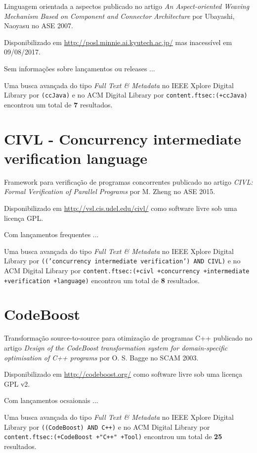 Linguagem orientada a aspectos
publicado no artigo {\it An Aspect-oriented Weaving Mechanism Based on Component and Connector Architecture}
por Ubayashi, Naoyasu
no ASE 2007.

Disponibilizado em \url{http://posl.minnie.ai.kyutech.ac.jp/}
mas inacessível em 09/08/2017.

Sem informações sobre lançamentos ou releases ...


Uma busca avançada do tipo {\it Full Text \& Metadata} no IEEE Xplore Digital Library por
\texttt{(ccJava)}
e no ACM Digital Library por
\texttt{content.ftsec:(+ccJava)}
encontrou um total de
{\bf 7}
resultados.

\section{CIVL - Concurrency intermediate verification language}

Framework para verificação de programas concorrentes
publicado no artigo {\it CIVL: Formal Verification of Parallel Programs}
por M. Zheng
no ASE 2015.

Disponibilizado em \url{http://vsl.cis.udel.edu/civl/}
como software livre
sob uma licença GPL.

Com lançamentos frequentes ...


Uma busca avançada do tipo {\it Full Text \& Metadata} no IEEE Xplore Digital Library por
\texttt{(('concurrency intermediate verification') AND CIVL)}
e no ACM Digital Library por
\texttt{content.ftsec:(+civl +concurrency +intermediate +verification +language)}
encontrou um total de
{\bf 8}
resultados.

\section{CodeBoost}

Transformação source-to-source para otimização de programas C++
publicado no artigo {\it Design of the CodeBoost transformation system for domain-specific optimisation of C++ programs}
por O. S. Bagge
no SCAM 2003.

Disponibilizado em \url{http://codeboost.org/}
como software livre
sob uma licença GPL v2.

Com lançamentos ocsaionais ...


Uma busca avançada do tipo {\it Full Text \& Metadata} no IEEE Xplore Digital Library por
\texttt{((CodeBoost) AND C++)}
e no ACM Digital Library por
\texttt{content.ftsec:(+CodeBoost +"C++" +Tool)}
encontrou um total de
{\bf 25}
resultados.

